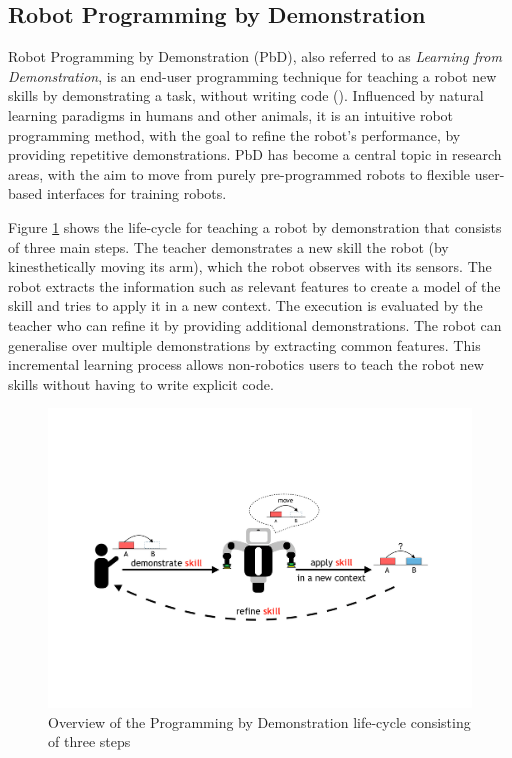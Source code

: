 \subsection{Robot Programming by Demonstration}
Robot Programming by Demonstration (PbD), also referred to as \textit{Learning from Demonstration}, is an end-user programming technique for teaching a robot new skills by demonstrating a task, without writing code (\cite{billard2008robot}).
Influenced by natural learning paradigms in humans and other animals, it is an intuitive robot programming method, with the goal to refine the robot's performance, by providing repetitive demonstrations.
PbD has become a central topic in research areas, with the aim to move from purely pre-programmed robots to flexible user-based interfaces for training robots.

Figure \ref{fig:Principle Overview} shows the life-cycle for teaching a robot by demonstration that consists of three main steps.
The teacher demonstrates a new skill the robot (\eg by kinesthetically moving its arm), which the robot observes with its sensors.
The robot %
extracts the information such as relevant features to create a model of the skill and tries to apply it in a new context.
The execution is evaluated by the teacher who can refine it by providing additional demonstrations.
The robot can generalise over multiple demonstrations by extracting common features. %
This incremental learning process allows non-robotics users to teach the robot new skills without having to write explicit code.

\begin{figure}[h]
	\centering
	\includegraphics[width=0.75\linewidth]{figures/PbD-Overview}
	\caption{Overview of the Programming by Demonstration life-cycle consisting of three steps}
	\label{fig:Principle Overview}
\end{figure}

